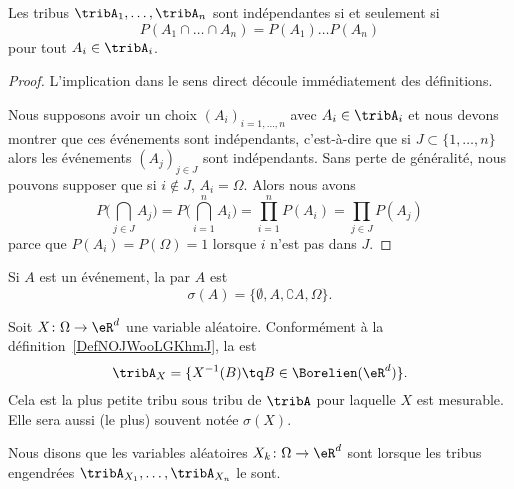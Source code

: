 \begin{lemma}       \label{LemTribIndepProdProb}
    Les tribus \( \tribA_1,\ldots,\tribA_n\) sont indépendantes si et seulement si
    \begin{equation}
        P(A_1\cap\ldots\cap A_n)=P(A_1)\ldots P(A_n)
    \end{equation}
    pour tout \( A_i\in\tribA_i\).
\end{lemma}

\begin{proof}
    L'implication dans le sens direct découle immédiatement des définitions.

    Nous supposons avoir un choix \( (A_i)_{i=1,\ldots,n}\) avec \( A_i\in\tribA_i\) et nous devons montrer que ces événements sont indépendants, c'est-à-dire que si \( J\subset\{ 1,\ldots,n \}\) alors les événements \( (A_j)_{j\in J}\) sont indépendants. Sans perte de généralité, nous pouvons supposer que si \( i\notin J\), \( A_i=\Omega\). Alors nous avons
    \begin{equation}
        P\big( \bigcap_{j\in J}A_j \big)=P\big( \bigcap_{i=1}^nA_i \big)=\prod_{i=1}^nP(A_i)=\prod_{j\in J}P(A_j)
    \end{equation}
    parce que \( P(A_i)=P(\Omega)=1\) lorsque \( i\) n'est pas dans \( J\).
\end{proof}

Si \( A\) est un événement, la  par \( A\) est
\begin{equation}
    \sigma(A)=\{ \emptyset,A,\complement A,\Omega \}.
\end{equation}

Soit \( X\colon \Omega\to \eR^d\) une variable aléatoire. Conformément à la définition~\ref{DefNOJWooLGKhmJ}, la  est
\begin{equation}
    \tribA_X=\{ X^{-1}(B)\tq B\in\Borelien(\eR^d) \}.
\end{equation}
Cela est la plus petite tribu sous tribu de \( \tribA\) pour laquelle \( X\) est mesurable. Elle sera aussi (le plus) souvent notée \( \sigma(X)\).

\begin{definition}  \label{DefNJUkotc}
    Nous disons que les variables aléatoires \( X_k\colon \Omega\to \eR^d\) sont  lorsque les tribus engendrées \( \tribA_{X_1},\ldots,\tribA_{X_n}\) le sont.
\end{definition}

